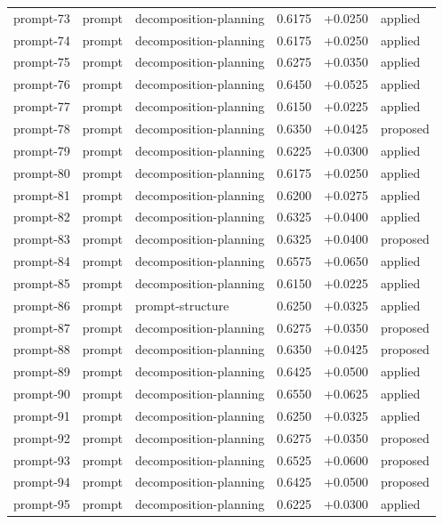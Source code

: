 \begin{center}
\begin{longtable}{llp{5.2cm}rrl}
prompt-73 & prompt & decomposition-planning & 0.6175 & +0.0250 & applied \\
prompt-74 & prompt & decomposition-planning & 0.6175 & +0.0250 & applied \\
prompt-75 & prompt & decomposition-planning & 0.6275 & +0.0350 & applied \\
prompt-76 & prompt & decomposition-planning & 0.6450 & +0.0525 & applied \\
prompt-77 & prompt & decomposition-planning & 0.6150 & +0.0225 & applied \\
prompt-78 & prompt & decomposition-planning & 0.6350 & +0.0425 & proposed \\
prompt-79 & prompt & decomposition-planning & 0.6225 & +0.0300 & applied \\
prompt-80 & prompt & decomposition-planning & 0.6175 & +0.0250 & applied \\
prompt-81 & prompt & decomposition-planning & 0.6200 & +0.0275 & applied \\
prompt-82 & prompt & decomposition-planning & 0.6325 & +0.0400 & applied \\
prompt-83 & prompt & decomposition-planning & 0.6325 & +0.0400 & proposed \\
prompt-84 & prompt & decomposition-planning & 0.6575 & +0.0650 & applied \\
prompt-85 & prompt & decomposition-planning & 0.6150 & +0.0225 & applied \\
prompt-86 & prompt & prompt-structure & 0.6250 & +0.0325 & applied \\
prompt-87 & prompt & decomposition-planning & 0.6275 & +0.0350 & proposed \\
prompt-88 & prompt & decomposition-planning & 0.6350 & +0.0425 & proposed \\
prompt-89 & prompt & decomposition-planning & 0.6425 & +0.0500 & applied \\
prompt-90 & prompt & decomposition-planning & 0.6550 & +0.0625 & applied \\
prompt-91 & prompt & decomposition-planning & 0.6250 & +0.0325 & applied \\
prompt-92 & prompt & decomposition-planning & 0.6275 & +0.0350 & proposed \\
prompt-93 & prompt & decomposition-planning & 0.6525 & +0.0600 & proposed \\
prompt-94 & prompt & decomposition-planning & 0.6425 & +0.0500 & proposed \\
prompt-95 & prompt & decomposition-planning & 0.6225 & +0.0300 & applied \\

\end{longtable}
\end{center}
